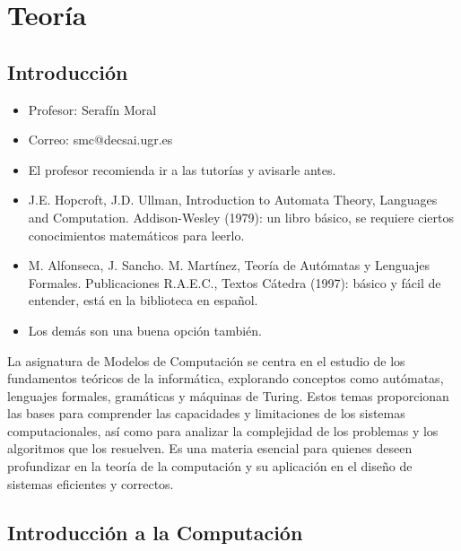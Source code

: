 \documentclass[12pt]{book} %
\providecommand{\tightlist}{%
  \setlength{\itemsep}{0pt}\setlength{\parskip}{0pt}}
\begin{document}
\part{Teoría}

\hypertarget{introducciuxf3n}{%
\chapter{Introducción}\label{introducciuxf3n}}

\begin{itemize}
\tightlist
\item
  Profesor: Serafín Moral\\
\item
  Correo: smc@decsai.ugr.es\\
\item
  El profesor recomienda ir a las tutorías y avisarle antes.\\
\item
  J.E. Hopcroft, J.D. Ullman, Introduction to Automata Theory, Languages
  and Computation. Addison-Wesley (1979): un libro básico, se requiere
  ciertos conocimientos matemáticos para leerlo.\\
\item
  M. Alfonseca, J. Sancho. M. Martínez, Teoría de Autómatas y Lenguajes
  Formales. Publicaciones R.A.E.C., Textos Cátedra (1997): básico y
  fácil de entender, está en la biblioteca en español.\\
\item
  Los demás son una buena opción también.
\end{itemize}

La asignatura de Modelos de Computación se centra en el estudio de los
fundamentos teóricos de la informática, explorando conceptos como
autómatas, lenguajes formales, gramáticas y máquinas de Turing. Estos
temas proporcionan las bases para comprender las capacidades y
limitaciones de los sistemas computacionales, así como para analizar la
complejidad de los problemas y los algoritmos que los resuelven. Es una
materia esencial para quienes deseen profundizar en la teoría de la
computación y su aplicación en el diseño de sistemas eficientes y
correctos.

\hypertarget{introducciuxf3n-a-la-computaciuxf3n}{%
\chapter{Introducción a la
Computación}\label{introducciuxf3n-a-la-computaciuxf3n}}
\end{document}
